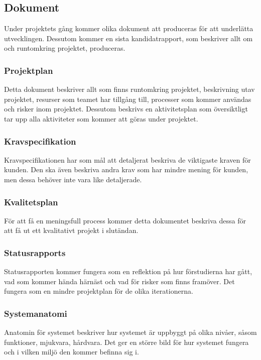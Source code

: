 \subsection{Dokument}
Under projektets gång kommer olika dokument att produceras för att underlätta utvecklingen.
Dessutom kommer en sista kandidatrapport, som beskriver allt om och runtomkring projektet,
produceras.

\subsubsection*{Projektplan}
Detta dokument beskriver allt som finns runtomkring projektet, beskrivning utav projektet, 
resurser som teamet har tillgång till, processer som kommer användas och risker inom projektet.
Dessutom beskrivs en aktivitetsplan som översiktligt tar upp alla aktiviteter som kommer att
göras under projektet.

\subsubsection*{Kravspecifikation}
Kravspecifikationen har som mål att detaljerat beskriva de viktigaste kraven för kunden.
Den ska även beskriva andra krav som har mindre mening för kunden, men dessa behöver inte vara
like detaljerade.

\subsubsection*{Kvalitetsplan}
För att få en meningsfull process kommer detta dokumentet beskriva dessa för att få ut ett 
kvalitativt projekt i slutändan.

\subsubsection*{Statusrapports}
Statusrapporten kommer fungera som en reflektion på hur förstudierna har gått, vad som kommer
hända härnäst och vad för risker som finns framöver. Det fungera som en mindre projektplan för
de olika iterationerna.

\subsubsection*{Systemanatomi}
Anatomin för systemet beskriver hur systemet är uppbyggt på olika nivåer, såsom funktioner, 
mjukvara, hårdvara. Det ger en större bild för hur systemet fungera och i vilken miljö den kommer
befinna sig i.

